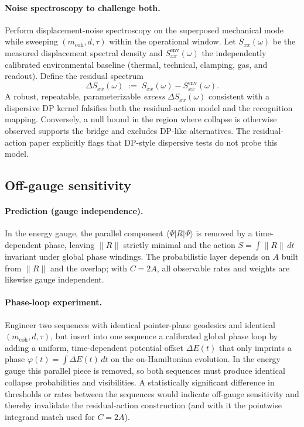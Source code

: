 \documentclass[11pt,letterpaper]{article}
\theoremstyle{definition}
\begin{document}
\paragraph{Noise spectroscopy to challenge both.}
Perform displacement-noise spectroscopy on the superposed mechanical mode while sweeping $(m_{\mathrm{coh}}, d, \tau)$ within the operational window. Let $S_{xx}(\omega)$ be the measured displacement spectral density and $S_{xx}^{\mathrm{env}}(\omega)$ the independently calibrated environmental baseline (thermal, technical, clamping, gas, and readout). Define the residual spectrum
\begin{equation}
\Delta S_{xx}(\omega)\;:=\;S_{xx}(\omega)-S_{xx}^{\mathrm{env}}(\omega).
\end{equation}
A robust, repeatable, parameterizable \emph{excess} $\Delta S_{xx}(\omega)$ consistent with a dispersive DP kernel falsifies both the residual-action model and the recognition mapping. Conversely, a null bound in the region where collapse is otherwise observed supports the bridge and excludes DP-like alternatives. The residual-action paper explicitly flags that DP-style dispersive tests do not probe this model.
\subsection{Off-gauge sensitivity}

\paragraph{Prediction (gauge independence).}
In the energy gauge, the parallel component $\langle\Psi|R|\Psi\rangle$ is removed by a time-dependent phase, leaving $\|R\|$ strictly minimal and the action $S=\int\!\|R\|\,dt$ invariant under global phase windings. The probabilistic layer depends on $A$ built from $\|R\|$ and the overlap; with $C=2A$, all observable rates and weights are likewise gauge independent.
\paragraph{Phase-loop experiment.}
Engineer two sequences with identical pointer-plane geodesics and identical $(m_{\mathrm{coh}}, d, \tau)$, but insert into one sequence a calibrated global phase loop by adding a uniform, time-dependent potential offset $\Delta E(t)$ that only imprints a phase $\varphi(t)=\int\!\Delta E(t)\,dt$ on the on-Hamiltonian evolution. In the energy gauge this parallel piece is removed, so both sequences must produce identical collapse probabilities and visibilities. A statistically significant difference in thresholds or rates between the sequences would indicate off-gauge sensitivity and thereby invalidate the residual-action construction (and with it the pointwise integrand match used for $C=2A$).
\end{document}
